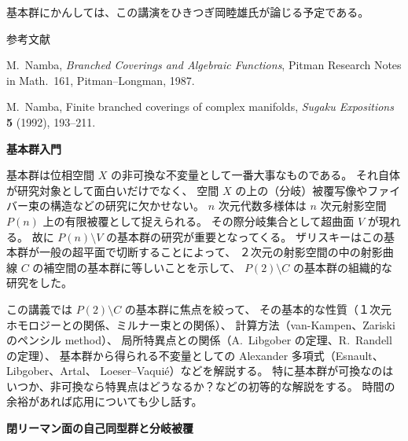 \documentclass[uplatex,dvipdfmx]{jlreq}
\begin{document}
基本群にかんしては、この講演をひきつぎ岡睦雄氏が論じる予定である。

\begin{center}\textsc{参考文献}\end{center}

\begin{enumerate}[{[1]}]
  \setlength{\itemsep}{2pt}
  \item[{[1]}] M.~Namba,
        \textit{Branched Coverings and Algebraic Functions},
        Pitman Research Notes in Math.\ 161, Pitman--Longman, 1987.
  \item[{[2]}] M.~Namba,
        Finite branched coverings of complex manifolds,
        \textit{Sugaku Expositions} \textbf{5} (1992), 193--211.
\end{enumerate}

\newpage

\begin{center}
{\Large\bfseries 基本群入門}

\hspace*{\fill}{\large\bfseries 岡 睦雄（都立大・理）}
\end{center}

\bigskip

基本群は位相空間 $X$ の非可換な不変量として一番大事なものである。
それ自体が研究対象として面白いだけでなく、
空間 $X$ の上の（分岐）被覆写像やファイバー束の構造などの研究に欠かせない。
$n$ 次元代数多様体は $n$ 次元射影空間 $P(n)$ 上の有限被覆として捉えられる。
その際分岐集合として超曲面 $V$ が現れる。
故に $P(n)\setminus V$ の基本群の研究が重要となってくる。
ザリスキーはこの基本群が一般の超平面で切断することによって、
２次元の射影空間の中の射影曲線 $C$ の補空間の基本群に等しいことを示して、
$P(2)\setminus C$ の基本群の組織的な研究をした。

この講義では $P(2)\setminus C$ の基本群に焦点を絞って、
その基本的な性質（１次元ホモロジーとの関係、ミルナー束との関係）、
計算方法（van-Kampen、Zariski のペンシル method）、
局所特異点との関係（A.~Libgober の定理、R.~Randell の定理）、
基本群から得られる不変量としての Alexander 多項式（Esnault、Libgober、Artal、
Loeser--Vaquié）などを解説する。
特に基本群が可換なのはいつか、非可換なら特異点はどうなるか？などの初等的な解説をする。
時間の余裕があれば応用についても少し話す。

\newpage

\begin{center}
{\Large\bfseries 閉リーマン面の自己同型群と分岐被覆}

\hspace*{\fill}{\large\bfseries 難波 誠（阪大・理）}
\end{center}
\end{document}
